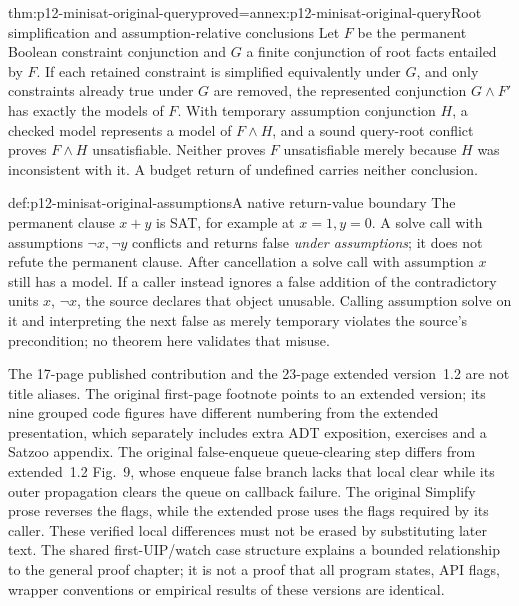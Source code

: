 \begin{hbtheorem}{thm:p12-minisat-original-query}{proved=annex:p12-minisat-original-query}{Root simplification and assumption-relative conclusions}
Let \(F\) be the permanent Boolean constraint conjunction and \(G\) a
finite conjunction of root facts entailed by \(F\).  If each retained
constraint is simplified equivalently under \(G\), and only constraints
already true under \(G\) are removed, the represented conjunction
\(G\land F'\) has exactly the models of \(F\).  With temporary assumption
conjunction \(H\), a checked model represents a model of \(F\land H\),
and a sound query-root conflict proves \(F\land H\) unsatisfiable.
Neither proves \(F\) unsatisfiable merely because \(H\) was inconsistent
with it.  A budget return of undefined carries neither conclusion.
\end{hbtheorem}

\begin{hbexample}{def:p12-minisat-original-assumptions}{A native return-value boundary}
The permanent clause \(x+y\) is SAT, for example at \(x=1,y=0\).
A solve call with assumptions \(\neg x,\neg y\) conflicts and returns
false \emph{under assumptions}; it does not refute the permanent clause.
After cancellation a solve call with assumption \(x\) still has a model.
If a caller instead ignores a false addition of the contradictory units
\(x\), \(\neg x\), the source declares that object unusable.  Calling
assumption solve on it and interpreting the next false as merely temporary
violates the source's precondition; no theorem here validates that misuse.
\end{hbexample}

The 17-page published contribution and the 23-page extended version~1.2 are
not title aliases.  The original first-page footnote points to an extended
version; its nine grouped code figures have different numbering from the
extended presentation, which separately includes extra ADT exposition,
exercises and a Satzoo appendix.  The original false-enqueue queue-clearing
step differs from extended~1.2 Fig.~9, whose enqueue false branch lacks that
local clear while its outer propagation clears the queue on callback failure.
The original Simplify prose reverses the flags, while the extended prose
uses the flags required by its caller.  These verified local differences
must not be erased by substituting later text.  The shared
first-UIP/watch case structure explains a bounded relationship to the general
proof chapter; it is not a proof that all program states, API flags, wrapper
conventions or empirical results of these versions are identical.
